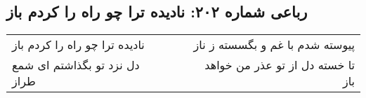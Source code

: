 \begin{center}
\section*{رباعی شماره ۲۰۲: نادیده ترا چو راه را کردم باز}
\label{sec:sh202}
\begin{longtable}{l p{0.5cm} r}
نادیده ترا چو راه را کردم باز
&&
پیوسته شدم با غم و بگسسته ز ناز
\\
دل نزد تو بگذاشتم ای شمع طراز
&&
تا خسته دل از تو عذر من خواهد باز
\\
\end{longtable}
\end{center}
